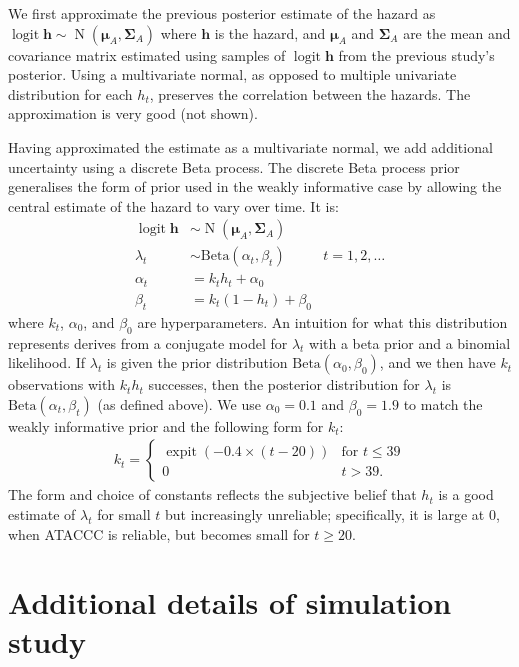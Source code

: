 \documentclass[referee,useAMS,usenatbib]{biom}
\def\dist{\sim}
\DeclareMathOperator{\logit}{logit}
\DeclareMathOperator{\MNorm}{N}
\DeclareMathOperator{\expit}{expit}
\newcommand\matr{\bm}
\renewcommand{\vec}[1]{\bm{#1}}
\begin{document}
We first approximate the previous posterior estimate of the hazard as $\logit{\vec{h}} \dist \MNorm(\vec{\mu}_A, \matr{\Sigma}_A)$ where $\vec{h}$ is the hazard, and $\vec{\mu}_A$ and $\matr{\Sigma}_A$ are the mean and covariance matrix estimated using samples of $\logit{\vec{h}}$ from the previous study's posterior.
Using a multivariate normal, as opposed to multiple univariate distribution for each $h_t$, preserves the correlation between the hazards.
The approximation is very good (not shown).

Having approximated the estimate as a multivariate normal, we add additional uncertainty using a discrete Beta process.
The discrete Beta process prior~\citep{ibrahimBayesian,sunStatisticala} generalises the form of prior used in the weakly informative case by allowing the central estimate of the hazard to vary over time.
It is:
\begin{align}
  \logit \vec{h} &\dist \MNorm(\vec{\mu}_A, \matr{\Sigma}_A) \\
  \lambda_t &\dist \text{Beta}(\alpha_t, \beta_t) &t = 1, 2, \dots \\
  \alpha_t &= k_t h_t + \alpha_0 \\
  \beta_t &= k_t (1 - h_t) + \beta_0
\end{align}
where $k_t$, $\alpha_0$, and $\beta_0$ are hyperparameters.
An intuition for what this distribution represents derives from a conjugate model for $\lambda_t$ with a beta prior and a binomial likelihood.
If $\lambda_t$ is given the prior distribution $\text{Beta}(\alpha_0, \beta_0)$, and we then have $k_t$ observations with $k_t h_t$ successes, then the posterior distribution for $\lambda_t$ is $\text{Beta}(\alpha_t, \beta_t)$ (as defined above).
We use $\alpha_0 = 0.1$ and $\beta_0 = 1.9$ to match the weakly informative prior and the following form for $k_t$:
\begin{align}
k_t = \begin{cases}
  \expit(-0.4 \times (t - 20)) &\text{for $t \leq 39$} \\
  0 &t > 39.
\end{cases}
\end{align}
The form and choice of constants reflects the subjective belief that $h_t$ is a good estimate of $\lambda_t$ for small $t$ but increasingly unreliable; specifically, it is large at 0, when ATACCC is reliable, but becomes small for $t \geq 20$.

\section{Additional details of simulation study}
\end{document}
